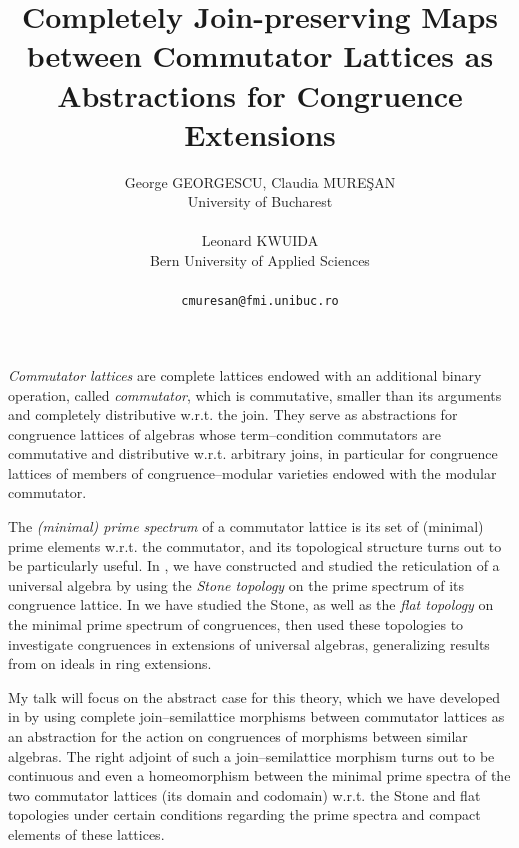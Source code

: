 \documentclass[a4paper]{article} %
\date{} %
\begin{document}
\setcounter{page}{1} %

\title{Completely Join-preserving Maps between Commutator Lattices as Abstractions for Congruence Extensions}

\author{George GEORGESCU, Claudia MURE\c SAN\\ %
       University of Bucharest\\ \\ %
       Leonard KWUIDA\\ %
       Bern University of Applied Sciences\\ \\ %
       \texttt{cmuresan@fmi.unibuc.ro} %
       }%

\maketitle


{\em Commutator lattices} \cite{stcommlat} are complete lattices endowed with an additional binary operation, called {\em commutator}, which is commutative, smaller than its arguments and completely distributive w.r.t. the join. They serve as abstractions for congruence lattices of algebras whose term--condition commutators are commutative and distributive w.r.t. arbitrary joins, in particular for congruence lattices of members of congruence--modular varieties endowed with the modular commutator.

The {\em (minimal) prime spectrum} of a commutator lattice is its set of (minimal) prime elements w.r.t. the commutator, and its topological structure turns out to be particularly useful. In \cite{retic,fctretic}, we have constructed and studied the reticulation of a universal algebra by using the {\em Stone topology} on the prime spectrum of its congruence lattice. In \cite{cgext} we have studied the Stone, as well as the {\em flat topology} on the minimal prime spectrum of congruences, then used these topologies to investigate congruences in extensions of universal algebras, generalizing results from \cite{bhadremcgov} on ideals in ring extensions.

My talk will focus on the abstract case for this theory, which we have developed in \cite{commlatext,commlatalgext} by using complete join--semilattice morphisms between commutator lattices as an abstraction for the action on congruences of morphisms between similar algebras. The right adjoint of such a join--semilattice morphism turns out to be continuous and even a homeomorphism between the minimal prime spectra of the two commutator lattices (its domain and codomain) w.r.t. the Stone and flat topologies under certain conditions regarding the prime spectra and compact elements of these lattices.
\end{document}
